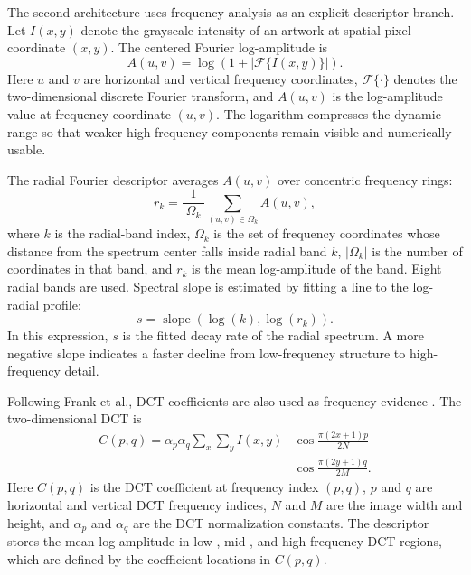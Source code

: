 ﻿\documentclass[10pt,twocolumn]{article}
\begin{document}
The second architecture uses frequency analysis as an explicit descriptor branch. Let \(I(x,y)\) denote the grayscale intensity of an artwork at spatial pixel coordinate \((x,y)\). The centered Fourier log-amplitude is
\[
A(u,v)=\log(1+|\mathcal{F}\{I(x,y)\}|).
\]
Here \(u\) and \(v\) are horizontal and vertical frequency coordinates, \(\mathcal{F}\{\cdot\}\) denotes the two-dimensional discrete Fourier transform, and \(A(u,v)\) is the log-amplitude value at frequency coordinate \((u,v)\). The logarithm compresses the dynamic range so that weaker high-frequency components remain visible and numerically usable.

The radial Fourier descriptor averages \(A(u,v)\) over concentric frequency rings:
\[
r_k=\frac{1}{|\Omega_k|}\sum_{(u,v)\in\Omega_k} A(u,v),
\]
where \(k\) is the radial-band index, \(\Omega_k\) is the set of frequency coordinates whose distance from the spectrum center falls inside radial band \(k\), \(|\Omega_k|\) is the number of coordinates in that band, and \(r_k\) is the mean log-amplitude of the band. Eight radial bands are used. Spectral slope is estimated by fitting a line to the log-radial profile:
\[
s=\operatorname{slope}\left(\log(k),\log(r_k)\right).
\]
In this expression, \(s\) is the fitted decay rate of the radial spectrum. A more negative slope indicates a faster decline from low-frequency structure to high-frequency detail.

Following Frank et al., DCT coefficients are also used as frequency evidence \cite{frank}. The two-dimensional DCT is
\[
\begin{aligned}
C(p,q)=\alpha_p\alpha_q\sum_x\sum_y I(x,y)
&\cos\frac{\pi(2x+1)p}{2N}\\
&\cos\frac{\pi(2y+1)q}{2M}.
\end{aligned}
\]
Here \(C(p,q)\) is the DCT coefficient at frequency index \((p,q)\), \(p\) and \(q\) are horizontal and vertical DCT frequency indices, \(N\) and \(M\) are the image width and height, and \(\alpha_p\) and \(\alpha_q\) are the DCT normalization constants. The descriptor stores the mean log-amplitude in low-, mid-, and high-frequency DCT regions, which are defined by the coefficient locations in \(C(p,q)\).
\end{document}
